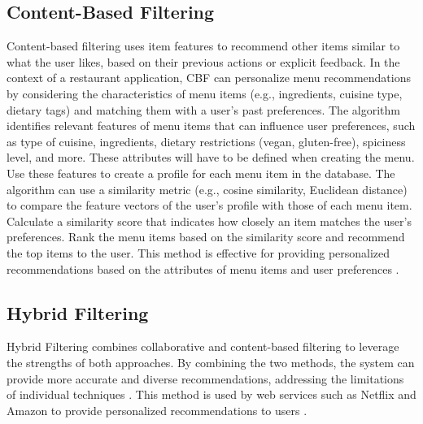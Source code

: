 \subsection*{Content-Based Filtering}
Content-based filtering uses item features to recommend other items similar to what the user likes, based on their previous actions or explicit feedback. In the context of a restaurant application, CBF can personalize menu recommendations by considering the characteristics of menu items (e.g., ingredients, cuisine type, dietary tags) and matching them with a user’s past preferences. The algorithm identifies relevant features of menu items that can influence user preferences, such as type of cuisine, ingredients, dietary restrictions (vegan, gluten-free), spiciness level, and more. These attributes will have to be defined when creating the menu. Use these features to create a profile for each menu item in the database. The algorithm can use a similarity metric (e.g., cosine similarity, Euclidean distance) to compare the feature vectors of the user’s profile with those of each menu item. Calculate a similarity score that indicates how closely an item matches the user's preferences. Rank the menu items based on the similarity score and recommend the top items to the user. This method is effective for providing personalized recommendations based on the attributes of menu items and user preferences \cite{29}.

\subsection*{Hybrid Filtering}
Hybrid Filtering combines collaborative and content-based filtering to leverage the strengths of both approaches. By combining the two methods, the system can provide more accurate and diverse recommendations, addressing the limitations of individual techniques \cite{30}. This method is used by web services such as Netflix and Amazon to provide personalized recommendations to users \cite{33}.

